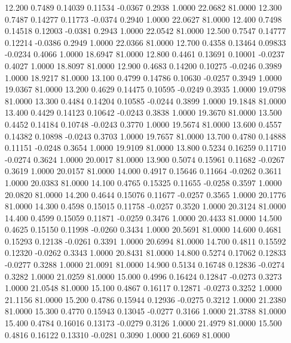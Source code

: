   12.200   0.7489   0.14039   0.11534  -0.0367   0.2938   1.0000  22.0682  81.0000
  12.300   0.7487   0.14277   0.11773  -0.0374   0.2940   1.0000  22.0627  81.0000
  12.400   0.7498   0.14518   0.12003  -0.0381   0.2943   1.0000  22.0542  81.0000
  12.500   0.7547   0.14777   0.12214  -0.0386   0.2949   1.0000  22.0366  81.0000
  12.700   0.4358   0.13464   0.09833  -0.0234   0.4066   1.0000  18.6947  81.0000
  12.800   0.4461   0.13691   0.10001  -0.0237   0.4027   1.0000  18.8097  81.0000
  12.900   0.4683   0.14200   0.10275  -0.0246   0.3989   1.0000  18.9217  81.0000
  13.100   0.4799   0.14786   0.10630  -0.0257   0.3949   1.0000  19.0367  81.0000
  13.200   0.4629   0.14475   0.10595  -0.0249   0.3935   1.0000  19.0798  81.0000
  13.300   0.4484   0.14204   0.10585  -0.0244   0.3899   1.0000  19.1848  81.0000
  13.400   0.4429   0.14123   0.10642  -0.0243   0.3838   1.0000  19.3670  81.0000
  13.500   0.4452   0.14184   0.10748  -0.0243   0.3770   1.0000  19.5674  81.0000
  13.600   0.4557   0.14382   0.10898  -0.0243   0.3703   1.0000  19.7657  81.0000
  13.700   0.4780   0.14888   0.11151  -0.0248   0.3654   1.0000  19.9109  81.0000
  13.800   0.5234   0.16259   0.11710  -0.0274   0.3624   1.0000  20.0017  81.0000
  13.900   0.5074   0.15961   0.11682  -0.0267   0.3619   1.0000  20.0157  81.0000
  14.000   0.4917   0.15646   0.11664  -0.0262   0.3611   1.0000  20.0383  81.0000
  14.100   0.4765   0.15325   0.11655  -0.0258   0.3597   1.0000  20.0820  81.0000
  14.200   0.4644   0.15076   0.11677  -0.0257   0.3565   1.0000  20.1776  81.0000
  14.300   0.4598   0.15015   0.11758  -0.0257   0.3520   1.0000  20.3124  81.0000
  14.400   0.4599   0.15059   0.11871  -0.0259   0.3476   1.0000  20.4433  81.0000
  14.500   0.4625   0.15150   0.11998  -0.0260   0.3434   1.0000  20.5691  81.0000
  14.600   0.4681   0.15293   0.12138  -0.0261   0.3391   1.0000  20.6994  81.0000
  14.700   0.4811   0.15592   0.12320  -0.0262   0.3343   1.0000  20.8431  81.0000
  14.800   0.5274   0.17062   0.12833  -0.0277   0.3288   1.0000  21.0091  81.0000
  14.900   0.5134   0.16748   0.12836  -0.0274   0.3282   1.0000  21.0259  81.0000
  15.000   0.4996   0.16424   0.12847  -0.0273   0.3273   1.0000  21.0548  81.0000
  15.100   0.4867   0.16117   0.12871  -0.0273   0.3252   1.0000  21.1156  81.0000
  15.200   0.4786   0.15944   0.12936  -0.0275   0.3212   1.0000  21.2380  81.0000
  15.300   0.4770   0.15943   0.13045  -0.0277   0.3166   1.0000  21.3788  81.0000
  15.400   0.4784   0.16016   0.13173  -0.0279   0.3126   1.0000  21.4979  81.0000
  15.500   0.4816   0.16122   0.13310  -0.0281   0.3090   1.0000  21.6069  81.0000
